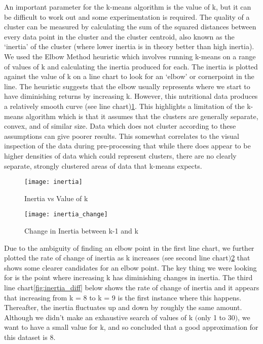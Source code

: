 \documentclass[journal]{IEEEtran}
\begin{document}
An important parameter for the k-means algorithm is the value of k, but it can be difficult to work out and some experimentation is required. The quality of a cluster can be measured by calculating the sum of the squared distances between every data point in the cluster and the cluster centroid, also known as the ‘inertia’ of the cluster (where lower inertia is in theory better than high inertia). We used the Elbow Method heuristic which involves running k-means on a range of values of k and calculating the inertia produced for each. The inertia is plotted against the value of k on a line chart to look for an ‘elbow’ or cornerpoint in the line. The heuristic suggests that the elbow usually represents where we start to have diminishing returns by increasing k. However, this nutritional data produces a relatively smooth curve (see line chart)\ref{fig:inertia_vs_k}. This highlights a limitation of the k-means algorithm which is that it assumes that the clusters are generally separate, convex, and of similar size. Data which does not cluster according to these assumptions can give poorer results. This somewhat correlates to the visual inspection of the data during pre-processing that while there does appear to be higher densities of data which could represent clusters, there are no clearly separate, strongly clustered areas of data that k-means expects.


\begin{figure}[ht]
\centering
\texttt{[image: inertia]}
\caption{Inertia vs Value of k}
\label{fig:inertia_vs_k}
\end{figure}

\begin{figure}[ht]
\centering
\texttt{[image: inertia\_change]}
\caption{Change in Inertia between k-1 and k}
\label{fig:inertia_change}
\end{figure}

Due to the ambiguity of finding an elbow point in the first line chart, we further plotted the rate of change of inertia as k increases $($see second line chart$)$\ref{fig:inertia_change} that shows some clearer candidates for an elbow point. The key thing we were looking for is the point where increasing k has diminishing changes in inertia. The third line chart\ref{fig:inertia_diff} below shows the rate of change of inertia and it appears that increasing from k = 8 to k = 9 is the first instance where this happens. Thereafter, the inertia fluctuates up and down by roughly the same amount. Although we didn’t make an exhaustive search of values of k $($only 1 to 30$)$, we want to have a small value for k, and so concluded that a good approximation for this dataset is 8.
\end{document}

